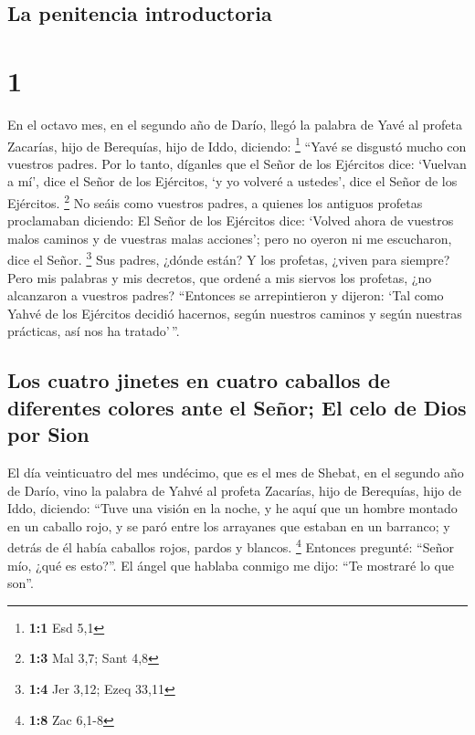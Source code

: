 \hypertarget{la-penitencia-introductoria}{%
\subsection{La penitencia
introductoria}\label{la-penitencia-introductoria}}

\hypertarget{section}{%
\section{1}\label{section}}

 En el octavo mes, en el segundo año de Darío, llegó la
palabra de Yavé al profeta Zacarías, hijo de Berequías, hijo de Iddo,
diciendo: \footnote{\textbf{1:1} Esd 5,1}  ``Yavé se
disgustó mucho con vuestros padres.  Por lo tanto,
díganles que el Señor de los Ejércitos dice: `Vuelvan a mí', dice el
Señor de los Ejércitos, `y yo volveré a ustedes', dice el Señor de los
Ejércitos. \footnote{\textbf{1:3} Mal 3,7; Sant 4,8}  No
seáis como vuestros padres, a quienes los antiguos profetas proclamaban
diciendo: El Señor de los Ejércitos dice: `Volved ahora de vuestros
malos caminos y de vuestras malas acciones'; pero no oyeron ni me
escucharon, dice el Señor. \footnote{\textbf{1:4} Jer 3,12; Ezeq 33,11}
 Sus padres, ¿dónde están? Y los profetas, ¿viven para
siempre?  Pero mis palabras y mis decretos, que ordené a
mis siervos los profetas, ¿no alcanzaron a vuestros padres? ``Entonces
se arrepintieron y dijeron: `Tal como Yahvé de los Ejércitos decidió
hacernos, según nuestros caminos y según nuestras prácticas, así nos ha
tratado'\,''.

\hypertarget{los-cuatro-jinetes-en-cuatro-caballos-de-diferentes-colores-ante-el-seuxf1or-el-celo-de-dios-por-sion}{%
\subsection{Los cuatro jinetes en cuatro caballos de diferentes colores
ante el Señor; El celo de Dios por
Sion}\label{los-cuatro-jinetes-en-cuatro-caballos-de-diferentes-colores-ante-el-seuxf1or-el-celo-de-dios-por-sion}}

 El día veinticuatro del mes undécimo, que es el mes de
Shebat, en el segundo año de Darío, vino la palabra de Yahvé al profeta
Zacarías, hijo de Berequías, hijo de Iddo, diciendo: 
``Tuve una visión en la noche, y he aquí que un hombre montado en un
caballo rojo, y se paró entre los arrayanes que estaban en un barranco;
y detrás de él había caballos rojos, pardos y blancos. \footnote{\textbf{1:8}
  Zac 6,1-8}  Entonces pregunté: ``Señor mío, ¿qué es
esto?''. El ángel que hablaba conmigo me dijo: ``Te mostraré lo que
son''.

